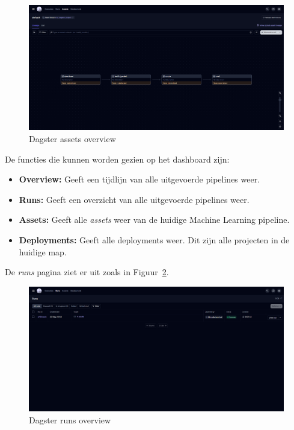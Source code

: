 \begin{figure}[h]
    \centering
    \includegraphics[width=0.9\linewidth]{graphics/Dagster_Assets.PNG}
    \caption{Dagster assets overview}
    \label{fig:Dagser_assets}
\end{figure}

De functies die kunnen worden gezien op het dashboard zijn:

\begin{itemize}
    \item \textbf{Overview:} Geeft een tijdlijn van alle uitgevoerde pipelines weer.
    \item \textbf{Runs:} Geeft een overzicht van alle uitgevoerde pipelines weer.
    \item \textbf{Assets:} Geeft alle \textit{assets} weer van de huidige Machine Learning pipeline.
    \item \textbf{Deployments:} Geeft alle deployments weer. Dit zijn alle projecten in de huidige map.
\end{itemize}

De \textit{runs} pagina ziet er uit zoals in Figuur~\ref{fig:Dagser_runs}.
\begin{figure}[ht]
    \centering
    \includegraphics[width=0.9\linewidth]{graphics/Dagster_Runs.PNG}
    \caption{Dagster runs overview}
    \label{fig:Dagser_runs}
\end{figure}

